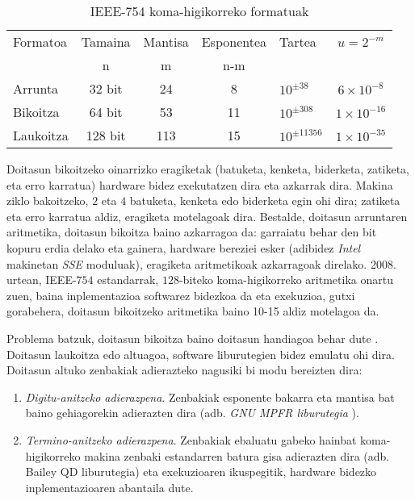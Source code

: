 \begin{table} [h!]
\caption{IEEE-754 koma-higikorreko formatuak}
\label{tab:koma-higikorreko-aritmetikak}       %
\centering
\begin{tabular}{ l c c c l c} 
 \hline
 Formatoa      &  Tamaina    & Mantisa   & Esponentea  & Tartea           &  $u=2^{-m}$          \\
               &    n        & m         & n-m         &                  &                      \\
   \hline
 Arrunta   & 32 bit      & 24  & 8  & $10^{\pm 38}$    &  $6 \times 10^{-8}$   \\	    
 Bikoitza  & 64 bit      & 53  & 11 & $10^{\pm 308}$   &  $1 \times 10^{-16}$   \\
 Laukoitza & 128 bit     & 113 & 15 & $10^{\pm 11356}$ &  $1 \times 10^{-35}$   \\
\hline
\end{tabular}
\end{table}


Doitasun bikoitzeko oinarrizko eragiketak (batuketa, kenketa, biderketa, zatiketa, eta erro karratua) hardware bidez exekutatzen dira \cite{Muller2009} eta azkarrak dira. Makina ziklo bakoitzeko, $2$ eta $4$ batuketa, kenketa edo biderketa egin ohi dira; zatiketa eta erro karratua aldiz, eragiketa motelagoak dira. Bestalde, doitasun arruntaren  aritmetika, doitasun bikoitza baino azkarragoa da: garraiatu behar den bit kopuru erdia delako eta gainera, hardware bereziei esker (adibidez \emph{Intel} makinetan \emph{SSE} moduluak), eragiketa aritmetikoak azkarragoak direlako. 2008. urtean, IEEE-$754$ estandarrak, $128$-biteko koma-higikorreko aritmetika onartu zuen, baina  inplementazioa  softwarez bidezkoa da eta exekuzioa, gutxi gorabehera, doitasun bikoitzeko aritmetika baino 10-15 aldiz motelagoa da.

Problema batzuk, doitasun bikoitza baino doitasun handiagoa behar dute \cite{Joldes2016}. Doitasun laukoitza edo altuagoa, software liburutegien bidez emulatu ohi dira. Doitasun altuko zenbakiak adierazteko nagusiki bi modu bereizten dira:   

\begin{enumerate}
\item \emph{Digitu-anitzeko adierazpena}. Zenbakiak esponente bakarra eta mantisa bat baino gehiagorekin adierazten dira (adb. \emph{GNU MPFR liburutegia} \cite{Fousse2007}).
\item \emph{Termino-anitzeko adierazpena}. Zenbakiak  ebaluatu gabeko hainbat koma-higikorreko makina zenbaki estandarren batura gisa adierazten dira (adb. Bailey QD liburutegia) \cite{Hida2001} eta exekuzioaren ikuspegitik, hardware bidezko inplementazioaren abantaila dute.    
\end{enumerate}

